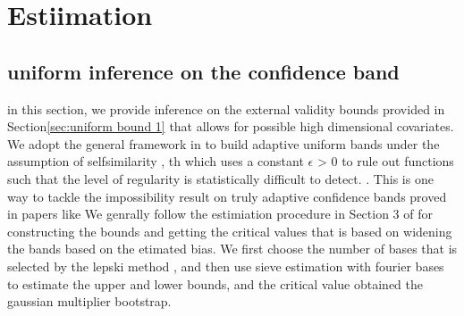 \documentclass{article}
\begin{document}
\section{Estiimation}

\subsection{ uniform inference on the confidence band }
in this section, we provide inference on the external validity bounds provided in Section\ref{sec:uniform bound 1} that allows for possible high dimensional covariates.  We adopt the general framework in \cite{chernozhukov honest} to build adaptive uniform bands under the assumption of selfsimilarity , th which uses a constant $\epsilon$ > 0 to rule out functions such that the level of regularity is statistically difficult to detect. \cite{picard tirbou, armstrong 2021} . This is one way to tackle the impossibility result on truly adaptive confidence bands proved in papers like \cite{low 1997} 
 We genrally follow the estimiation procedure in Section 3 of \cite{chernozhukov 2014} for constructing the bounds and getting the critical values that is based on widening the bands based on the etimated bias. We first choose  the number of bases that is selected by the lepski method , and then use sieve estimation with fourier bases  to estimate the upper and lower bounds, and the critical value obtained the gaussian multiplier bootstrap. 
\end{document}
